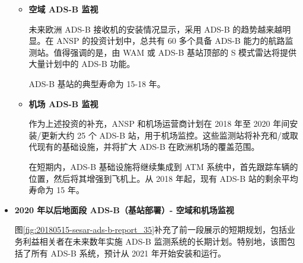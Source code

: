 \begin{itemize}

    \begin{itemize}
        \item \textbf{空域 ADS-B 监视}

        未来欧洲 ADS-B 接收机的安装情况显示，采用 ADS-B 的趋势越来越明显。在 ANSP 的投资计划中，总共有 60 多个具备 ADS-B 能力的航路监测站。值得强调的是，由 WAM 或 ADS-B 基站顶部的 S 模式雷达将提供大量计划中的 ADS-B 功能。

        ADS-B 基站的典型寿命为 15-18 年。

        \item \textbf{机场 ADS-B 监视}

        作为上述投资的补充，ANSP 和机场运营商计划在 2018 年至 2020 年间安装/更新大约 25 个 ADS-B 站，用于机场监控。这些监测站将补充和/或取代现有的基础设施，并将扩大 ADS-B 在欧洲机场的覆盖范围。

        在短期内，ADS-B 基础设施将继续集成到 ATM 系统中，首先跟踪车辆的位置，然后将其增强到飞机上。从 2018 年起，现有 ADS-B 站的剩余平均寿命为 15 年。
    \end{itemize}

    \item \textbf{2020 年以后地面段 ADS-B（基站部署）- 空域和机场监视}

    图\ref{fig:20180515-sesar-ads-b-report_35}补充了前一段展示的短期规划，包括业务利益相关者在未来数年实施 ADS-B 监测系统的长期计划。特别地，该图包括了所有 ADS-B 系统，预计从 2021 年开始安装和运行。


\end{itemize}
